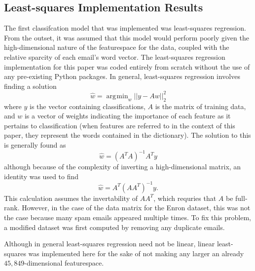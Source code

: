 \documentclass{article}
\DeclareMathOperator*{\argmin}{arg\!\min}
\begin{document}
\subsection{Least-squares Implementation Results}
The first classifcation model that was implemented was least-squares regression. From the outset, it was assumed that this model would perform poorly given the high-dimensional nature of the featurespace for the data, coupled with the relative sparcity of each email's word vector. The least-squares regression implementation for this paper was coded entirely from scratch without the use of any pre-existing Python packages. In general, least-squares regression involves finding a solution 
$$\hat{w} = \argmin_w{ ||y-Aw||^2_2}$$ where $y$ is the vector containing classifications, $A$ is the matrix of training data, and $w$ is a vector of weights indicating the importance of each feature as it pertains to classification (when features are referred to in the context of this paper, they represent the words contained in the dictionary). The solution to this is generally found as $$\hat{w} = (A^TA)^{-1}A^Ty$$ although because of the complexity of inverting a high-dimensional matrix, an identity was used to find $$\hat{w} = A^T(AA^T)^{-1}y.$$ This calculation assumes the invertability of $AA^T$, which requries that $A$ be full-rank. However, in the case of the data matrix for the Enron dataset, this was not the case because many spam emails appeared multiple times. To fix this problem, a modified dataset was first computed by removing any duplicate emails.

 Although in general least-squares regression need not be linear, linear least-squares was implemented here for the sake of not making any larger an already $45,849$-dimensional featurespace.
\end{document}
